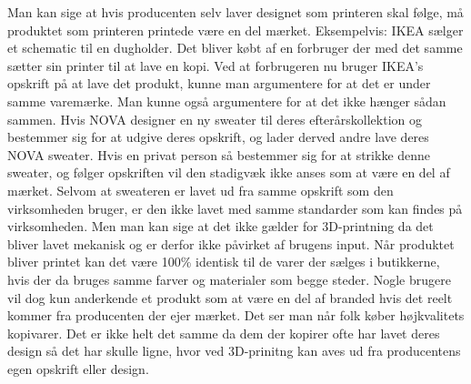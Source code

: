 Man kan sige at hvis producenten selv laver designet som printeren skal følge, må produktet som printeren printede være en del mærket. Eksempelvis: IKEA sælger et schematic til en dugholder. Det bliver købt af en forbruger der med det samme sætter sin printer til at lave en kopi. Ved at forbrugeren nu bruger IKEA’s opskrift på at lave det produkt, kunne man argumentere for at det er under samme varemærke.
Man kunne også argumentere for at det ikke hænger sådan sammen. Hvis NOVA designer en ny sweater til deres efterårskollektion og bestemmer sig for at udgive deres opskrift, og lader derved andre lave deres NOVA sweater. Hvis en privat person så bestemmer sig for at strikke denne sweater, og følger opskriften vil den stadigvæk ikke anses som at være en del af mærket. Selvom at sweateren er lavet ud fra samme opskrift som den virksomheden bruger, er den ikke lavet med samme standarder som kan findes på virksomheden. 
Men man kan sige at det ikke gælder for 3D-printning da det bliver lavet mekanisk og er derfor ikke påvirket af brugens input. Når produktet bliver printet kan det være 100\% identisk til de varer der sælges i butikkerne, hvis der da bruges samme farver og materialer som begge steder. 
Nogle brugere vil dog kun anderkende et produkt som at være en del af branded hvis det reelt kommer fra producenten der ejer mærket. Det ser man når folk køber højkvalitets kopivarer. Det er ikke helt det samme da dem der kopirer ofte har lavet deres design så det har skulle ligne, hvor ved 3D-prinitng kan aves ud fra producentens egen opskrift eller design.



